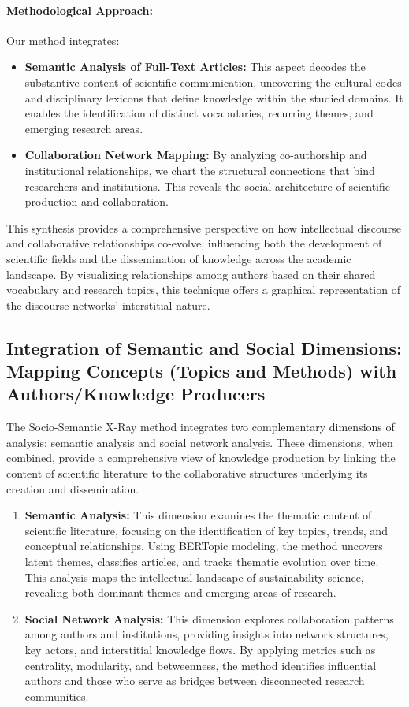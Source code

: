 \documentclass[12pt]{article}
\begin{document}
\paragraph{Methodological Approach:}
Our method integrates:
\begin{itemize}
    \item \textbf{Semantic Analysis of Full-Text Articles:} This aspect decodes the substantive content of scientific communication, uncovering the cultural codes and disciplinary lexicons that define knowledge within the studied domains. It enables the identification of distinct vocabularies, recurring themes, and emerging research areas.
    \item \textbf{Collaboration Network Mapping:} By analyzing co-authorship and institutional relationships, we chart the structural connections that bind researchers and institutions. This reveals the social architecture of scientific production and collaboration.
\end{itemize}

This synthesis provides a comprehensive perspective on how intellectual discourse and collaborative relationships co-evolve, influencing both the development of scientific fields and the dissemination of knowledge across the academic landscape. By visualizing relationships among authors based on their shared vocabulary and research topics, this technique offers a graphical representation of the discourse networks' interstitial nature.


\subsection{Integration of Semantic and Social Dimensions: Mapping Concepts (Topics and Methods) with Authors/Knowledge Producers}
The Socio-Semantic X-Ray method integrates two complementary dimensions of analysis: semantic analysis and social network analysis. These dimensions, when combined, provide a comprehensive view of knowledge production by linking the content of scientific literature to the collaborative structures underlying its creation and dissemination.

\begin{enumerate}
    \item \textbf{Semantic Analysis:} This dimension examines the thematic content of scientific literature, focusing on the identification of key topics, trends, and conceptual relationships. Using BERTopic modeling, the method uncovers latent themes, classifies articles, and tracks thematic evolution over time. This analysis maps the intellectual landscape of sustainability science, revealing both dominant themes and emerging areas of research.
    \item \textbf{Social Network Analysis:} This dimension explores collaboration patterns among authors and institutions, providing insights into network structures, key actors, and interstitial knowledge flows. By applying metrics such as centrality, modularity, and betweenness, the method identifies influential authors and those who serve as bridges between disconnected research communities.
\end{enumerate}
\end{document}
